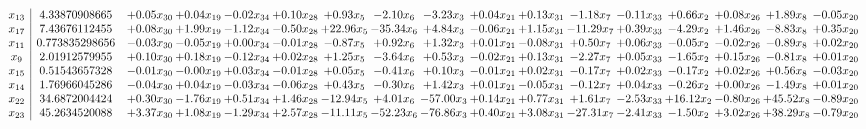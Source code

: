 \documentclass[9pt]{article}
\begin{document}
 \[\begin{array}{c| c c@{\hskip 2pt} c@{\hskip 2pt} c@{\hskip 2pt} c@{\hskip 2pt} c@{\hskip 2pt} c@{\hskip 2pt} c@{\hskip 2pt} c@{\hskip 2pt} c@{\hskip 2pt} c@{\hskip 2pt} c@{\hskip 2pt} c@{\hskip 2pt} c@{\hskip 2pt} c@{\hskip 2pt} c@{\hskip 2pt} }
 x_{13}   &  4.33870908665 & +  0.05 x_{30} & +  0.04 x_{19} & -0.02 x_{34} & +  0.10 x_{28} & +  0.93 x_{5} & -2.10 x_{6} & -3.23 x_{3} & +  0.04 x_{21} & +  0.13 x_{31} & -1.18 x_{7} & -0.11 x_{33} & +  0.66 x_{2} & +  0.08 x_{26} & +  1.89 x_{8} & -0.05 x_{20}\\
 x_{17}   &  7.43676112455 & +  0.08 x_{30} & +  1.99 x_{19} & -1.12 x_{34} & -0.50 x_{28} & + 22.96 x_{5} & -35.34 x_{6} & +  4.84 x_{3} & -0.06 x_{21} & +  1.15 x_{31} & -11.29 x_{7} & +  0.39 x_{33} & -4.29 x_{2} & +  1.46 x_{26} & -8.83 x_{8} & +  0.35 x_{20}\\
 x_{11}   &  0.773835298656 & -0.03 x_{30} & -0.05 x_{19} & +  0.00 x_{34} & -0.01 x_{28} & -0.87 x_{5} & +  0.92 x_{6} & +  1.32 x_{3} & +  0.01 x_{21} & -0.08 x_{31} & +  0.50 x_{7} & +  0.06 x_{33} & -0.05 x_{2} & -0.02 x_{26} & -0.89 x_{8} & +  0.02 x_{20}\\
 x_{9}   &  2.01912579955 & +  0.10 x_{30} & +  0.18 x_{19} & -0.12 x_{34} & +  0.02 x_{28} & +  1.25 x_{5} & -3.64 x_{6} & +  0.53 x_{3} & -0.02 x_{21} & +  0.13 x_{31} & -2.27 x_{7} & +  0.05 x_{33} & -1.65 x_{2} & +  0.15 x_{26} & -0.81 x_{8} & +  0.01 x_{20}\\
 x_{15}   &  0.51543657328 & -0.01 x_{30} & -0.00 x_{19} & +  0.03 x_{34} & -0.01 x_{28} & +  0.05 x_{5} & -0.41 x_{6} & +  0.10 x_{3} & -0.01 x_{21} & +  0.02 x_{31} & -0.17 x_{7} & +  0.02 x_{33} & -0.17 x_{2} & +  0.02 x_{26} & +  0.56 x_{8} & -0.03 x_{20}\\
 x_{14}   &  1.76966045286 & -0.04 x_{30} & +  0.04 x_{19} & -0.03 x_{34} & -0.06 x_{28} & +  0.43 x_{5} & -0.30 x_{6} & +  1.42 x_{3} & +  0.01 x_{21} & -0.05 x_{31} & -0.12 x_{7} & +  0.04 x_{33} & -0.26 x_{2} & +  0.00 x_{26} & -1.49 x_{8} & +  0.01 x_{20}\\
 x_{22}   &  34.6872004424 & +  0.30 x_{30} & -1.76 x_{19} & +  0.51 x_{34} & +  1.46 x_{28} & -12.94 x_{5} & +  4.01 x_{6} & -57.00 x_{3} & +  0.14 x_{21} & +  0.77 x_{31} & +  1.61 x_{7} & -2.53 x_{33} & + 16.12 x_{2} & -0.80 x_{26} & + 45.52 x_{8} & -0.89 x_{20}\\
 x_{23}   &  45.2634520088 & +  3.37 x_{30} & +  1.08 x_{19} & -1.29 x_{34} & +  2.57 x_{28} & -11.11 x_{5} & -52.23 x_{6} & -76.86 x_{3} & +  0.40 x_{21} & +  3.08 x_{31} & -27.31 x_{7} & -2.41 x_{33} & -1.50 x_{2} & +  3.02 x_{26} & + 38.29 x_{8} & -0.79 x_{20}\\

\end{array}\]
\end{document}
